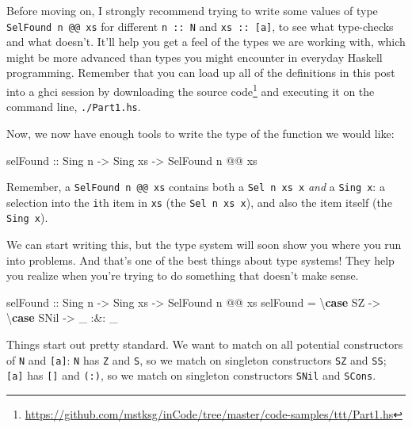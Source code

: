 \documentclass[]{article}
\newenvironment{Shaded}{}{}
\newcommand{\DataTypeTok}[1]{\textcolor[rgb]{0.56,0.13,0.00}{#1}}
\newcommand{\KeywordTok}[1]{\textcolor[rgb]{0.00,0.44,0.13}{\textbf{#1}}}
\newcommand{\NormalTok}[1]{#1}
\newcommand{\OperatorTok}[1]{\textcolor[rgb]{0.40,0.40,0.40}{#1}}
\newcommand{\OtherTok}[1]{\textcolor[rgb]{0.00,0.44,0.13}{#1}}
\renewcommand{\href}[2]{#2\footnote{\url{#1}}}
\begin{document}
Before moving on, I strongly recommend trying to write some values of type
\texttt{SelFound\ n\ @@\ xs} for different \texttt{n\ ::\ N} and
\texttt{xs\ ::\ {[}a{]}}, to see what type-checks and what doesn't. It'll help
you get a feel of the types we are working with, which might be more advanced
than types you might encounter in everyday Haskell programming. Remember that
you can load up all of the definitions in this post into a ghci session by
downloading
\href{https://github.com/mstksg/inCode/tree/master/code-samples/ttt/Part1.hs}{the
source code} and executing it on the command line, \texttt{./Part1.hs}.

Now, we now have enough tools to write the type of the function we would like:

\begin{Shaded}
\begin{Highlighting}[]
\NormalTok{selFound}
\OtherTok{    ::} \DataTypeTok{Sing}\NormalTok{ n}
    \OtherTok{{-}>} \DataTypeTok{Sing}\NormalTok{ xs}
    \OtherTok{{-}>} \DataTypeTok{SelFound}\NormalTok{ n }\OperatorTok{@@}\NormalTok{ xs}
\end{Highlighting}
\end{Shaded}

Remember, a \texttt{SelFound\ n\ @@\ xs} contains both a \texttt{Sel\ n\ xs\ x}
\emph{and} a \texttt{Sing\ x}: a selection into the \texttt{i}th item in
\texttt{xs} (the \texttt{Sel\ n\ xs\ x}), and also the item itself (the
\texttt{Sing\ x}).

We can start writing this, but the type system will soon show you where you run
into problems. And that's one of the best things about type systems! They help
you realize when you're trying to do something that doesn't make sense.

\begin{Shaded}
\begin{Highlighting}[]
\NormalTok{selFound}
\OtherTok{    ::} \DataTypeTok{Sing}\NormalTok{ n}
    \OtherTok{{-}>} \DataTypeTok{Sing}\NormalTok{ xs}
    \OtherTok{{-}>} \DataTypeTok{SelFound}\NormalTok{ n }\OperatorTok{@@}\NormalTok{ xs}
\NormalTok{selFound }\OtherTok{=}\NormalTok{ \textbackslash{}}\KeywordTok{case}
    \DataTypeTok{SZ} \OtherTok{{-}>}\NormalTok{ \textbackslash{}}\KeywordTok{case}
      \DataTypeTok{SNil} \OtherTok{{-}>}\NormalTok{ \_ }\OperatorTok{:\&:}\NormalTok{ \_}
\end{Highlighting}
\end{Shaded}

Things start out pretty standard. We want to match on all potential constructors
of \texttt{N} and \texttt{{[}a{]}}: \texttt{N} has \texttt{Z} and \texttt{S}, so
we match on singleton constructors \texttt{SZ} and \texttt{SS}; \texttt{{[}a{]}}
has \texttt{{[}{]}} and \texttt{(:)}, so we match on singleton constructors
\texttt{SNil} and \texttt{SCons}.
\end{document}

